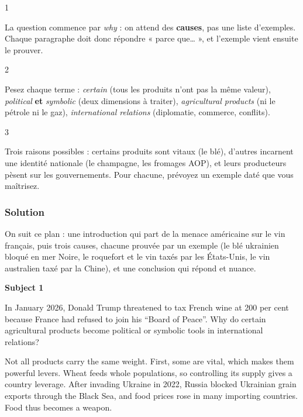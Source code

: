 \documentclass[11pt,a4paper]{article}
\begin{document}
\begin{indication}{1}

La question commence par \emph{why} : on attend des \textbf{causes}, pas une liste d'exemples. Chaque paragraphe doit donc répondre « parce que\ldots{} », et l'exemple vient ensuite le prouver.

\end{indication}

\begin{indication}{2}

Pesez chaque terme : \emph{certain} (tous les produits n'ont pas la même valeur), \emph{political} \textbf{et} \emph{symbolic} (deux dimensions à traiter), \emph{agricultural products} (ni le pétrole ni le gaz), \emph{international relations} (diplomatie, commerce, conflits).

\end{indication}

\begin{indication}{3}

Trois raisons possibles : certains produits sont vitaux (le blé), d'autres incarnent une identité nationale (le champagne, les fromages AOP), et leurs producteurs pèsent sur les gouvernements. Pour chacune, prévoyez un exemple daté que vous maîtrisez.

\end{indication}

\hypertarget{solution-1}{%
\subsubsection{Solution}\label{solution-1}}

On suit ce plan : une introduction qui part de la menace américaine sur le vin français, puis trois causes, chacune prouvée par un exemple (le blé ukrainien bloqué en mer Noire, le roquefort et le vin taxés par les États-Unis, le vin australien taxé par la Chine), et une conclusion qui répond et nuance.

\textbf{Subject 1}

In January 2026, Donald Trump threatened to tax French wine at 200 per cent because France had refused to join his ``Board of Peace''. Why do certain agricultural products become political or symbolic tools in international relations?

Not all products carry the same weight. First, some are vital, which makes them powerful levers. Wheat feeds whole populations, so controlling its supply gives a country leverage. After invading Ukraine in 2022, Russia blocked Ukrainian grain exports through the Black Sea, and food prices rose in many importing countries. Food thus becomes a weapon.
\end{document}
